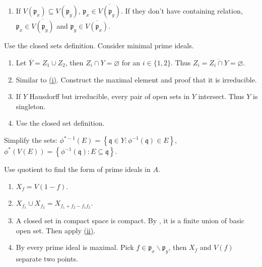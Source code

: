 \begin{exercise}\label{ex1.18}
	\begin{enumerate}
		\item[(iv)] If $V\left(\mathfrak{p}_x\right)\subseteq V\left(\mathfrak{p}_y\right)$, $\mathfrak{p}_x\in\overline{V\left(\mathfrak{p}_y\right)}$. If they don't have containing relation, $\mathfrak{p}_x\in\overline{V\left(\mathfrak{p}_y\right)}$ and $\mathfrak{p}_y\in\overline{V\left(\mathfrak{p}_x\right)}$.
	\end{enumerate}
\end{exercise}

\begin{exercise}\label{ex1.19}
	Use the closed sets definition. Consider minimal prime ideals.
\end{exercise}

\begin{exercise}\label{ex1.20}
	\begin{enumerate}[label=(\roman*),ref=\theexercise(\roman*)]
		\item\label{ex1.20.1} Let $\overline{Y}=Z_1\cup Z_2$, then $Z_i\cap Y=\varnothing$ for an $i\in\{1,2\}$. Thus $Z_i=\overline{Z_i\cap Y}=\varnothing$.
		\item Similar to \hyperref[ex1.20.1]{(i)}. Construct the maximal element and proof that it is irreducible.
		\item If $Y$ Hausdorff but irreducible, every pair of open sets in $Y$ intersect. Thus $Y$ is singleton.
		\item\label{ex1.20.4} Use the closed set definition.
	\end{enumerate}
\end{exercise}

\begin{exercise}\label{ex1.21}
	Simplify the sets: $\phi^{*-1}(E)=\left\{\mathfrak{q}\in Y:\phi^{-1}(\mathfrak{q})\in E\right\}$, $\phi^{*}(V(E))=\left\{\phi^{-1}(\mathfrak{q}):E\subseteq\mathfrak{q}\right\}$.
\end{exercise}

\begin{exercise}\label{ex1.22}
	Use quotient to find the form of prime ideals in $A$.
\end{exercise}

\begin{exercise}\label{ex1.23}
	\begin{enumerate}[label=(\roman*),ref=\theexercise(\roman*)]
		\item $X_f=V(1-f)$.
		\item\label{ex1.23.2} $X_{f_1}\cup X_{f_2}=X_{f_1+f_2-f_1f_2}$.
		\item A closed set in compact space is compact. By , it is a finite union of basic open set. Then apply \hyperref[ex1.23.2]{(ii)}.
		\item\label{ex1.23.4} By  every prime ideal is maximal. Pick $f\in\mathfrak{p}_x\backslash\mathfrak{p}_y$, then $X_f$ and $V(f)$ separate two points.
	\end{enumerate}
\end{exercise}

